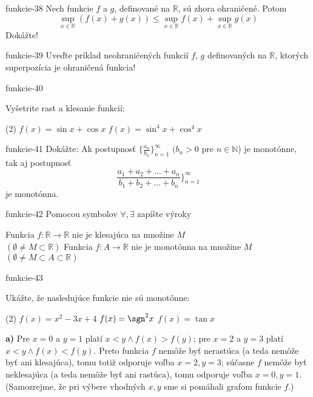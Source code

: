 \begin{defproblem}{funkcie-38}
Nech funkcie $f$ a $g$, definované na $\mathbb{R}$, sú zhora ohraničené. Potom
\[
  \sup_{x\in\mathbb{R}}(f(x)+g(x))
  \leq
  \sup_{x\in\mathbb{R}} f(x) + \sup_{x\in\mathbb{R}} g(x)
\]
Dokážte!
\end{defproblem}

\begin{defproblem}{funkcie-39}
Uveďte príklad neohraničených funkcií $f$, $g$ definovaných na $\mathbb{R}$,
ktorých superpozícia je ohraničená funkcia!
\end{defproblem}

\begin{defproblem}{funkcie-40}
\par
{}
Vyšetrite rast a klesanie funkcií:
\begin{tasks}(2)
  \task $f(x)=\sin x +\cos x$
  \task $f(x)=\sin^4 x +\cos^4 x$
\end{tasks}
\end{defproblem}

\begin{defproblem}{funkcie-41}
Dokážte: Ak postupnosť $\{\frac{a_n}{b_n}\}_{n=1}^\infty$ $(b_n>0$ pre
$n\in\mathbb{N}$) je monotónne, tak aj postupnosť
\[
  \frac{a_1+a_2+...+a_n}{b_1+b_2+...+b_n}\}_{n=1}^\infty
\]
je monotónna.
\end{defproblem}

\begin{defproblem}{funkcie-42}
Pomocou symbolov $\forall,\exists$ zapíšte výroky
\begin{tasks}
\task
  Funkcia $f:\mathbb{R} \rightarrow \mathbb{R}$ nie je klesajúca na množine $M$ \\
  $(\emptyset \neq M\subset\mathbb{R})$
\task
  Funkcia $f:A \rightarrow \mathbb{R}$ nie je monotónna na množine $M$ \\
  $(\emptyset \neq M\subset A \subset\mathbb{R})$
\end{tasks}
\end{defproblem}

\begin{defproblem}{funkcie-43}
\begin{samepage}
Ukážte, že nasledujúce funkcie nie sú monotónne:
\begin{tasks}(2)
  \task $f(x) = x^2 - 3x + 4$
  \task $f(x) = \sgn^2 x$
  \task $f(x) = \tan x$
\end{tasks}
\end{samepage}
\begin{solution}
  \textbf{a)}
  Pre $x=0$ a $y=1$ platí $x<y\wedge f(x)>f(y)$; pre $x=2$ a $y=3$ platí
  $x<y\wedge f(x)<f(y)$. Preto funkcia $f$ nemôže byť nerastúca (a teda nemôže
  byť ani klesajúca), tomu totiž odporuje voľba $x=2,y=3$; súčasne $f$ nemôže
  byť neklesajúca (a teda nemôže byť ani rastúca), tomu odporuje voľba
  $x=0,y=1$. (Samozrejme, že pri výbere vhodných $x,y$ sme si pomáhali grafom
  funkcie $f$.)
  \end{solution}
\end{defproblem}


